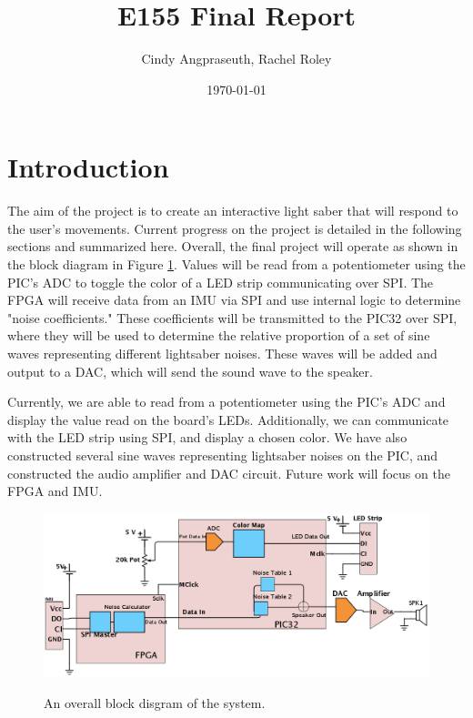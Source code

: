 \documentclass[11pt]{article}
\title{E155 Final Report}
\author{Cindy Angpraseuth, Rachel Roley}
\date{\today}
\begin{document}
\maketitle

\section{Introduction}


The aim of the project is to create an interactive light saber that will respond to the user's movements. Current progress on the project is detailed in the following sections and summarized here. Overall, the final project will operate as shown in the block diagram in Figure \ref{fig:block}. Values will be read from a potentiometer using the PIC's ADC to toggle the color of a LED strip communicating over SPI. The FPGA will receive data from an IMU via SPI and use internal logic to determine "noise coefficients." These coefficients will be transmitted to the PIC32 over SPI, where they will be used to determine the relative proportion of a set of sine waves representing different lightsaber noises. These waves will be added and output to a DAC, which will send the sound wave to the speaker.  

Currently, we are able to read from a potentiometer using the PIC's ADC and display the value read on the board's LEDs. Additionally, we can communicate with the LED strip using SPI, and display a chosen color. We have also constructed several sine waves representing lightsaber noises on the PIC, and constructed the audio amplifier and DAC circuit. Future work will focus on the FPGA and IMU. 


\begin{figure}[h!]
\centering
\includegraphics[width=1\textwidth]{SystemDiagram2.png}
\caption{\label{fig:block}} An overall block disgram of the system.
\end{figure}
\end{document}
